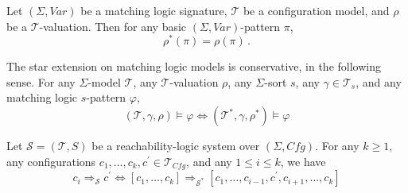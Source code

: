 \documentclass{article}
\newcommand{\Tcfg}{\mathcal{T}_{\mathit{Cfg}}}
\begin{document}
\begin{lemma}\label{lem:rhoStarOfPi}
    Let $(\Sigma, \mathit{Var})$ be a matching logic signature, $\mathcal{T}$ be a configuration model,
    and $\rho$ be a $\mathcal{T}$-valuation. Then for any basic $(\Sigma, \mathit{Var})$-pattern $\pi$,
    \begin{equation}
        \rho^*(\pi) = \rho(\pi) \, .
    \end{equation}
\end{lemma}

\begin{lemma}\label{lem:starConservative}
    The star extension on matching logic models is conservative, in the following sense.
    For any $\Sigma$-model $\mathcal{T}$, any $\mathcal{T}$-valuation $\rho$,
    any $\Sigma$-sort $s$,
    any $\gamma \in \mathcal{T}_s$,
    and any matching logic $s$-pattern $\varphi$,
    \begin{equation*}
        (\mathcal{T}, \gamma, \rho) \vDash \varphi \iff (\mathcal{T}^*, \gamma, \rho^*) \vDash \varphi
    \end{equation*}
\end{lemma}

\begin{lemma}\label{lem:compositeStep}
    Let $\mathcal{S} = (\mathcal{T}, S)$ be a reachability-logic system over $(\Sigma, \mathit{Cfg})$.
    For any $k \geq 1$, any configurations $c_1,\ldots,c_k, c^\prime \in \Tcfg$, and any $1 \leq i \leq k$,
    we have
    \begin{equation*}
        c_i \Rightarrow_{\mathcal{S}} c^\prime
                    \iff
        [c_1,\ldots,c_k] \Rightarrow_{\mathcal{S}^*} [c_1, \ldots, c_{i-1}, c^\prime, c_{i+1}, \ldots, c_k]
    \end{equation*}
\end{lemma}
\end{document}
